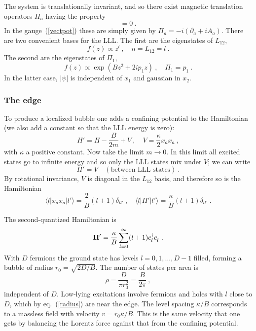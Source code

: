 \documentclass[a4paper,12pt]{article}
\begin{document}
The system is translationally invariant, and so there exist magnetic
translation operators $\Pi_a$ having the property
\begin{equation}
[\Pi_a,D_b]=0\ .
\end{equation}
In the gauge~(\ref{vectpot}) these are simply given by $\Pi_a =
-i(\partial_a + i A_a)$. There are two convenient bases for the LLL.  The
first are the eigenstates of
$L_{12}$,
\begin{equation}
f(z) \propto z^l\ ,\quad n = L_{12} = l\ .
\end{equation}
The second are the eigenstates of $\Pi_1$,
\begin{equation}
f(z) \propto \exp(B z^2 + 2ip_1 z)\ ,\quad  \Pi_1 = p_1\ .
\end{equation}
In the latter case, $|\psi|$ is independent of $x_1$ and gaussian in $x_2$.

\subsubsection{The edge}

To produce a localized bubble one adds a confining potential to the
Hamiltonian (we also add a constant so that the LLL energy is zero):
\begin{equation}
H' = H - \frac{B}{2m} + V\ , \quad V = \frac{\kappa}{2} x_a x_a\ ,
\label{conf}
\end{equation}
with $\kappa$ a positive constant.
Now take the limit $m \to 0$.  In this limit all excited states go to
infinite energy and so only the LLL states mix under $V$; we can write
\begin{equation}
H' = V \quad (\mbox{between LLL states})\ .
\end{equation}
By
rotational invariance, $V$ is diagonal in the $L_{12}$ basis, and
therefore so is the Hamiltonian
\begin{equation}
\langle l | x_a x_a | l' \rangle = \frac{2}{B} (l+1) \delta_{ll'} \
,\quad
\langle l | H' | l' \rangle = \frac{\kappa}{B} (l+1) \delta_{ll'} \ .
\label{radius}
\end{equation}

The second-quantized Hamiltonian is 
\begin{equation}
{\bf H}' = \frac{\kappa}{B} \sum_{l = 0}^\infty (l+1)
{c^\dagger_l} c^{\vphantom{\dagger}}_l \ .
\end{equation}
With $D$ fermions the ground state has levels $l = 0,1,
\ldots,D-1$ filled, forming a bubble of radius $r_0 = \sqrt{2D/B}$.
The number of states per area is
\begin{equation}
\rho = \frac{D}{\pi r_0^2} = \frac{B}{2\pi}\ ,
\end{equation}
independent of $D$.
Low-lying excitations involve fermions and holes with $l$ close to $D$,
which by eq.~(\ref{radius}) are near the edge.  
The level spacing $\kappa/B$ corresponds to a massless field with velocity $v
= r_0 \kappa/B$.  This is the same velocity that one gets by balancing the
Lorentz force against that from the confining potential.
\end{document}
